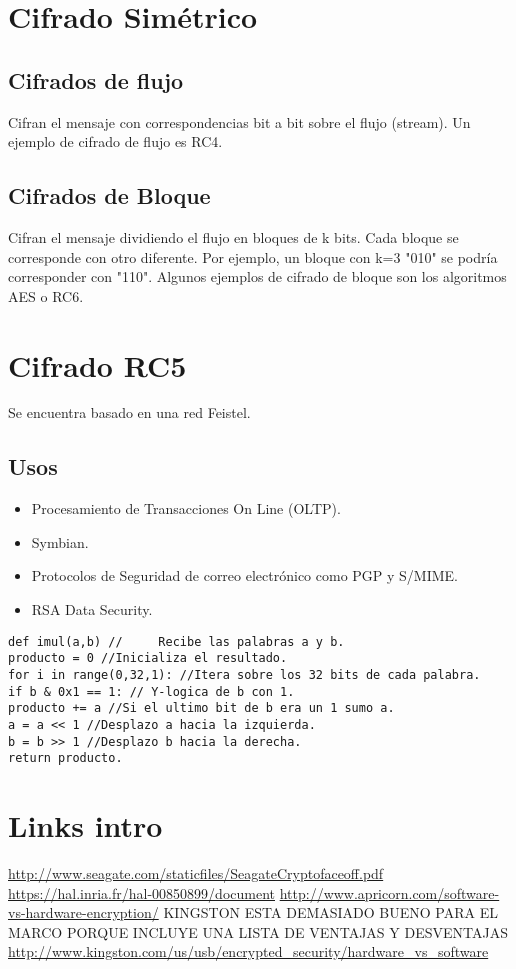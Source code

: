 \documentclass[12pt,letterpaper]{article}     %
\begin{document}
\section{Cifrado Simétrico}
\subsection{Cifrados de flujo}
Cifran el mensaje con correspondencias bit a bit sobre el flujo (stream). Un ejemplo de cifrado de flujo es RC4.

\subsection{Cifrados de Bloque}
Cifran el mensaje dividiendo el flujo en bloques de k bits. Cada bloque se corresponde con otro diferente. Por ejemplo, un bloque con k=3 "010" se podría corresponder con "110". Algunos ejemplos de cifrado de bloque son los algoritmos AES o RC6.


\section{Cifrado RC5}
Se encuentra basado en una red Feistel.
\subsection{Usos}
\begin{itemize}
\item Procesamiento de Transacciones On Line (OLTP).
\item Symbian.
\item Protocolos de Seguridad de correo electrónico como PGP y S/MIME.
\item RSA Data Security.
\end{itemize}

\begin{lstlisting}
def imul(a,b) //	 Recibe las palabras a y b.
producto = 0 //Inicializa el resultado.
for i in range(0,32,1): //Itera sobre los 32 bits de cada palabra.
if b & 0x1 == 1: // Y-logica de b con 1.
producto += a //Si el ultimo bit de b era un 1 sumo a.
a = a << 1 //Desplazo a hacia la izquierda.
b = b >> 1 //Desplazo b hacia la derecha.
return producto.
\end{lstlisting}


\section{Links intro}
\url{http://www.seagate.com/staticfiles/SeagateCryptofaceoff.pdf}
\url{https://hal.inria.fr/hal-00850899/document}
\url{http://www.apricorn.com/software-vs-hardware-encryption/}
KINGSTON ESTA DEMASIADO BUENO PARA EL MARCO PORQUE INCLUYE UNA LISTA DE VENTAJAS Y DESVENTAJAS
\url{http://www.kingston.com/us/usb/encrypted_security/hardware_vs_software}
\end{document}
